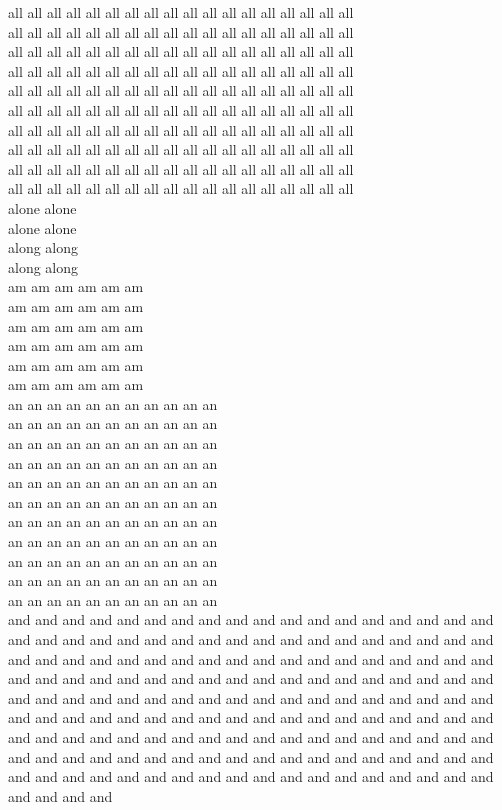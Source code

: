 all all all all all all all all all all all all all all all all all all\\
all all all all all all all all all all all all all all all all all all\\
all all all all all all all all all all all all all all all all all all\\
all all all all all all all all all all all all all all all all all all\\
all all all all all all all all all all all all all all all all all all\\
all all all all all all all all all all all all all all all all all all\\
all all all all all all all all all all all all all all all all all all\\
all all all all all all all all all all all all all all all all all all\\
all all all all all all all all all all all all all all all all all all\\
all all all all all all all all all all all all all all all all all all\\
alone alone\\
alone alone\\
along along\\
along along\\
am am am am am am\\
am am am am am am\\
am am am am am am\\
am am am am am am\\
am am am am am am\\
am am am am am am\\
an an an an an an an an an an an\\
an an an an an an an an an an an\\
an an an an an an an an an an an\\
an an an an an an an an an an an\\
an an an an an an an an an an an\\
an an an an an an an an an an an\\
an an an an an an an an an an an\\
an an an an an an an an an an an\\
an an an an an an an an an an an\\
an an an an an an an an an an an\\
an an an an an an an an an an an\\
and and and and and and and and and and and and and and and and and and and and and and and and and and and and and and and and and and and and and and and and and and and and and and and and and and and and and and and and and and and and and and and and and and and and and and and and and and and and and and and and and and and and and and and and and and and and and and and and and and and and and and and and and and and and and and and and and and and and and and and and and and and and and and and and and and and and and and and and and and and and and and and and and and and and and and and and and and and and and and and and and and and and and and\\
